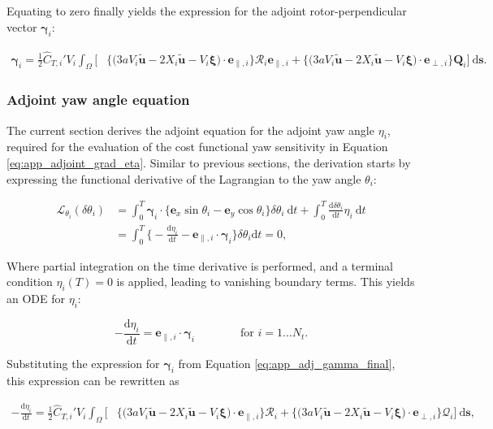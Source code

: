 \documentclass[energies,article,submit,moreauthors,latex,10pt,a4paper]{mdpi}
\newcommand{\ds}{~\text{d}\boldsymbol{s}}
\newcommand{\bs}[1]{\boldsymbol{#1}}
\newcommand{\dt}{\text{d}t}
\newcommand{\ddt}[1]{\frac{\text{d} #1}{\text{d} t}}
\newcommand{\sint}{\int_{\Omega}}
\newcommand{\Tint}{\int_{0}^{T}}
\newcommand{\utilde}{\widetilde{\bs{u}}}
\newcommand{\ctihat}{\widehat{C}_{T,i}'}
\newcommand{\R}{\mathscr{R}}
\newcommand{\Lagr}{\mathscr{L}}
\newcommand{\eperpi}{\bs{e}_{\perp,i}}
\newcommand{\etransi}{\bs{e}_{\parallel,i}}
\begin{document}
\noindent Equating to zero finally yields the expression for the adjoint rotor-perpendicular vector $\bs{\gamma}_i$:

\begin{align}
\bs{\gamma}_i = \frac{1}{2} \ctihat V_i \sint \bigg[ & \bigg\{ \bigg(3a V_i \utilde  - 2 X_i \utilde - V_i\bs{\xi} \bigg) \cdot \etransi   \bigg\} \R_i \etransi + \bigg\{ \bigg(3aV_i \utilde  -2 X_i \utilde - V_i\bs{\xi} \bigg) \cdot \eperpi \bigg\} \bs{Q}_i \bigg] \ds. \label{eq:app_adj_gamma_final}  
\end{align}

\subsubsection{Adjoint yaw angle equation}
\noindent The current section derives the adjoint equation for the adjoint yaw angle $\eta_i$, required for the evaluation of the cost functional yaw sensitivity in Equation \eqref{eq:app_adjoint_grad_eta}. Similar to previous sections, the derivation starts by expressing the functional derivative of the Lagrangian to the yaw angle $\theta_i$: 

\begin{align}
\Lagr_{\theta_i}(\delta \theta_i) &= 
\Tint \bs{\gamma}_i \cdot \bigg\{ \bs{e}_x \sin \theta_i - \bs{e}_y \cos \theta_i  \bigg\} \delta \theta_i ~\dt + \Tint \ddt{\delta \theta_i} \eta_i ~\dt \\ 
&= \Tint \bigg\{ -\ddt{\eta_i} - \etransi \cdot \bs{\gamma}_i   \bigg\} \delta \theta_i \dt = 0,
\end{align}

\noindent Where partial integration on the time derivative is performed, and a terminal condition $\eta_i(T) = 0$ is applied, leading to vanishing boundary terms. This yields an ODE for $\eta_i$:

\begin{equation}\label{eq:app_adj_eta_basic}
- \ddt{\eta_i} = \bs{e}_{\parallel,i} \cdot \bs{\gamma}_i 
\qquad\qquad \text{for } i=1\dots N_t.
\end{equation}

\noindent Substituting the expression for $\bs{\gamma}_i$ from Equation \eqref{eq:app_adj_gamma_final}, this expression can be rewritten as 

\begin{align}
- \ddt{\eta_i} =  \frac{1}{2} \ctihat V_i \sint \bigg[ & \bigg\{ \bigg(3a V_i \utilde  - 2 X_i \utilde - V_i\bs{\xi} \bigg) \cdot \etransi   \bigg\} \R_i + \bigg\{ \bigg(3aV_i \utilde  -2 X_i \utilde - V_i\bs{\xi} \bigg) \cdot \eperpi \bigg\} \mathscr{Q}_i \bigg] \ds, \label{eq:app_adj_eta_final} 
\end{align}
\end{document}
